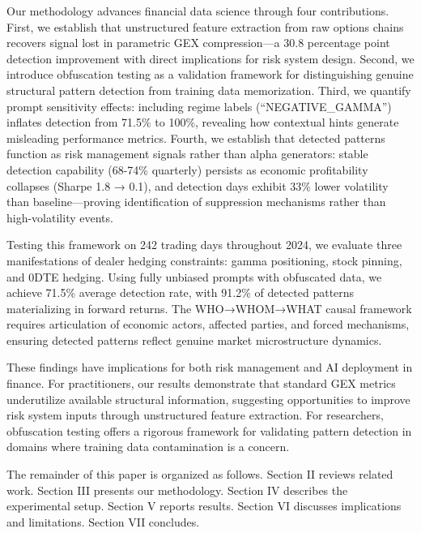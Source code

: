 Our methodology advances financial data science through four contributions. First, we establish that unstructured feature extraction from raw options chains recovers signal lost in parametric GEX compression—a 30.8 percentage point detection improvement with direct implications for risk system design. Second, we introduce obfuscation testing as a validation framework for distinguishing genuine structural pattern detection from training data memorization. Third, we quantify prompt sensitivity effects: including regime labels (``NEGATIVE\_GAMMA'') inflates detection from 71.5\% to 100\%, revealing how contextual hints generate misleading performance metrics. Fourth, we establish that detected patterns function as risk management signals rather than alpha generators: stable detection capability (68-74\% quarterly) persists as economic profitability collapses (Sharpe 1.8 → 0.1), and detection days exhibit 33\% lower volatility than baseline—proving identification of suppression mechanisms rather than high-volatility events.

Testing this framework on 242 trading days throughout 2024, we evaluate three manifestations of dealer hedging constraints: gamma positioning, stock pinning, and 0DTE hedging. Using fully unbiased prompts with obfuscated data, we achieve 71.5\% average detection rate, with 91.2\% of detected patterns materializing in forward returns. The WHO→WHOM→WHAT causal framework requires articulation of economic actors, affected parties, and forced mechanisms, ensuring detected patterns reflect genuine market microstructure dynamics.

These findings have implications for both risk management and AI deployment in finance. For practitioners, our results demonstrate that standard GEX metrics underutilize available structural information, suggesting opportunities to improve risk system inputs through unstructured feature extraction. For researchers, obfuscation testing offers a rigorous framework for validating pattern detection in domains where training data contamination is a concern.

The remainder of this paper is organized as follows. Section II reviews related work. Section III presents our methodology. Section IV describes the experimental setup. Section V reports results. Section VI discusses implications and limitations. Section VII concludes.
